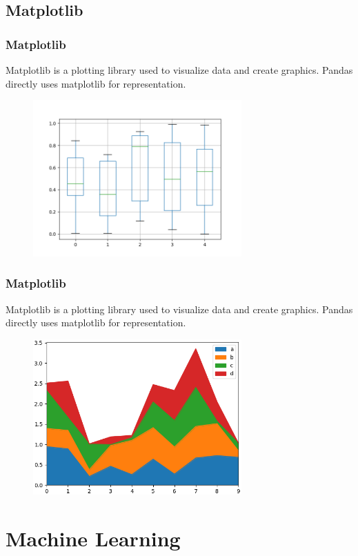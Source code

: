 \documentclass{beamer}
\begin{document}
\subsection{Matplotlib}
\begin{frame}
  \frametitle{Matplotlib}
  Matplotlib is a plotting library used to visualize data and create graphics.
  Pandas directly uses matplotlib for representation.
  \begin{figure}[h]
    \includegraphics[width=8cm]{img/matplotlib_1.png}
  \end{figure}
\end{frame}

\begin{frame}
  \frametitle{Matplotlib}
  Matplotlib is a plotting library used to visualize data and create graphics.
  Pandas directly uses matplotlib for representation.
  \begin{figure}[h]
    \includegraphics[width=8cm]{img/matplotlib_2.png}
  \end{figure}
\end{frame}



\section{Machine Learning}
\end{document}
